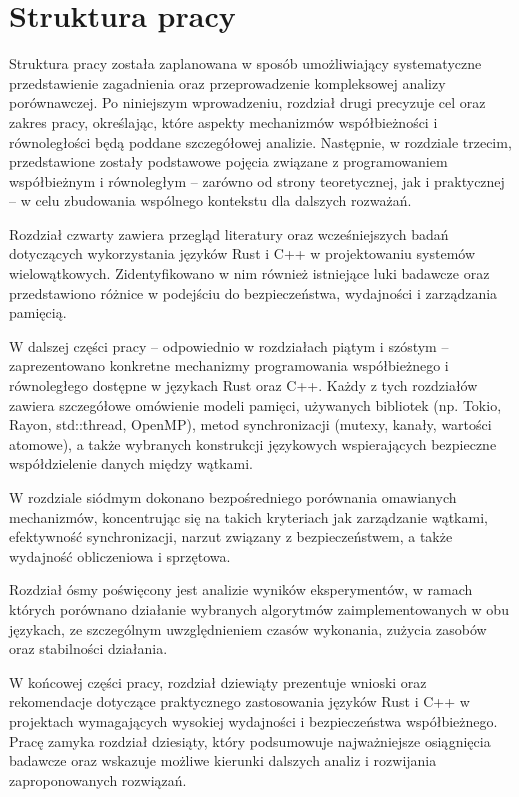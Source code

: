\section{Struktura pracy}
Struktura pracy została zaplanowana w sposób umożliwiający systematyczne przedstawienie zagadnienia oraz przeprowadzenie kompleksowej analizy porównawczej. Po niniejszym wprowadzeniu, rozdział drugi precyzuje cel oraz zakres pracy, określając, które aspekty mechanizmów współbieżności i równoległości będą poddane szczegółowej analizie. Następnie, w rozdziale trzecim, przedstawione zostały podstawowe pojęcia związane z programowaniem współbieżnym i równoległym – zarówno od strony teoretycznej, jak i praktycznej – w celu zbudowania wspólnego kontekstu dla dalszych rozważań.

Rozdział czwarty zawiera przegląd literatury oraz wcześniejszych badań dotyczących wykorzystania języków Rust i C++ w projektowaniu systemów wielowątkowych. Zidentyfikowano w nim również istniejące luki badawcze oraz przedstawiono różnice w podejściu do bezpieczeństwa, wydajności i zarządzania pamięcią.

W dalszej części pracy – odpowiednio w rozdziałach piątym i szóstym – zaprezentowano konkretne mechanizmy programowania współbieżnego i równoległego dostępne w językach Rust oraz C++. Każdy z tych rozdziałów zawiera szczegółowe omówienie modeli pamięci, używanych bibliotek (np. Tokio, Rayon, std::thread, OpenMP), metod synchronizacji (mutexy, kanały, wartości atomowe), a także wybranych konstrukcji językowych wspierających bezpieczne współdzielenie danych między wątkami.

W rozdziale siódmym dokonano bezpośredniego porównania omawianych mechanizmów, koncentrując się na takich kryteriach jak zarządzanie wątkami, efektywność synchronizacji, narzut związany z bezpieczeństwem, a także wydajność obliczeniowa i sprzętowa.

Rozdział ósmy poświęcony jest analizie wyników eksperymentów, w ramach których porównano działanie wybranych algorytmów zaimplementowanych w obu językach, ze szczególnym uwzględnieniem czasów wykonania, zużycia zasobów oraz stabilności działania.

W końcowej części pracy, rozdział dziewiąty prezentuje wnioski oraz rekomendacje dotyczące praktycznego zastosowania języków Rust i C++ w projektach wymagających wysokiej wydajności i bezpieczeństwa współbieżnego. Pracę zamyka rozdział dziesiąty, który podsumowuje najważniejsze osiągnięcia badawcze oraz wskazuje możliwe kierunki dalszych analiz i rozwijania zaproponowanych rozwiązań.

